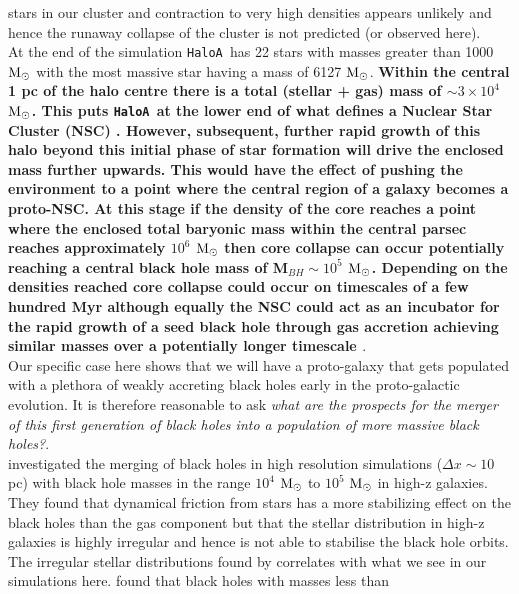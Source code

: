 \documentclass[twocolumn,iop,revtex4]{openjournal}
\newcommand{\msolar} {$\rm{M_{\odot}}~$}
\newcommand{\msolarc} {$\rm{M_{\odot}}$}
\newcommand{\ha} {\texttt{HaloA~}}
\begin{document}
stars in our cluster and contraction to very high densities appears unlikely and hence the
runaway collapse of the cluster is not predicted (or observed here). \\
\indent 
At the end of the simulation \ha has 22 stars with masses greater than 1000 \msolar with
the most massive star having a mass of 6127 \msolarc. \textbf{Within the central 1 pc of the 
  halo centre there is a total (stellar + gas) mass of $\sim 3 \times 10^4$ \msolarc.
  This puts \ha at the lower end of what defines a Nuclear Star Cluster (NSC) \citep[e.g.][]{Georgiev_2016}.
  However, subsequent, further rapid growth of this halo beyond this initial phase of star formation
  will drive the enclosed mass further upwards. This would have the effect of pushing the environment
  to a point where the central region of a galaxy becomes a proto-NSC. At this stage if the density
  of the core reaches a point where the enclosed total baryonic mass within the central parsec
  reaches approximately $10^6$ \msolar then core collapse can occur \citep{Davies_2011}
  potentially reaching a central black hole mass of M$_{BH} \sim 10^5$ \msolarc. Depending on the
  densities reached core collapse could occur on timescales of a few hundred Myr
  \citep{Davies_2011} although equally the NSC 
  could act as an incubator for the rapid growth of a seed black hole
  through gas accretion achieving
similar masses over a potentially longer timescale \citep{Natarajan_2020}}. \\
\indent Our specific case here shows that we will have a  proto-galaxy that gets populated with a plethora of
weakly accreting black holes early in the proto-galactic evolution. It is therefore reasonable to ask \textit{what are the prospects for the merger of this first generation
  of black holes into a population of more massive black holes?}. \\
\indent \cite{Pfister_2019} investigated the merging of black holes in high resolution
simulations ($\Delta x \sim 10$ pc) with black hole masses in the range
$10^4$ \msolar to $10^5$ \msolar in high-z galaxies. They found that dynamical friction from stars
has a more stabilizing effect on the black holes than the gas component but that the stellar
distribution in high-z galaxies is highly irregular and hence is not able to stabilise the black
hole orbits.
The irregular stellar distributions found by \cite{Pfister_2019} correlates with what
we see in our simulations here. \cite{Pfister_2019} found that black holes with masses less than
\end{document}

